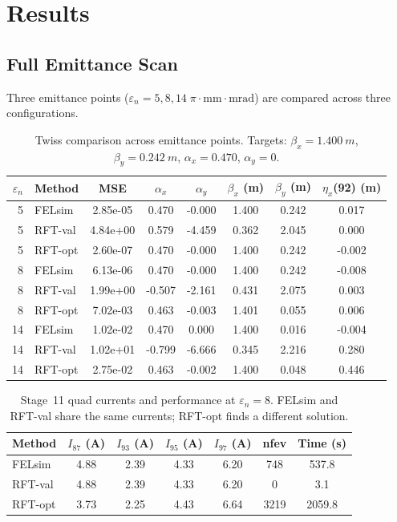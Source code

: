 \documentclass[11pt]{article}
\begin{document}
\section{Results}

\subsection{Full Emittance Scan}

Three emittance points ($\varepsilon_n = 5, 8, 14\;\pi\cdot\text{mm}\cdot\text{mrad}$)
are compared across three configurations.

\begin{table}[ht]
\centering
\small
\caption{Twiss comparison across emittance points.  Targets:
  $\beta_x = \SI{1.400}{m}$, $\beta_y = \SI{0.242}{m}$,
  $\alpha_x = 0.470$, $\alpha_y = 0$.}
\label{tab:twiss}
\begin{tabular}{@{} r l S[scientific-notation=true] S S S S S @{}}
\toprule
{$\varepsilon_n$} & {Method} & {MSE} & {$\alpha_x$} & {$\alpha_y$} & {$\beta_x$ (m)} & {$\beta_y$ (m)}
  & {$\eta_x$(92) (m)} \\
  & FELsim  & 2.85e-05 &  0.470 & -0.000 & 1.400 & 0.242 &  0.017 \\
5  & RFT-val & 4.84e+00 &  0.579 & -4.459 & 0.362 & 2.045 &  0.000 \\
5  & RFT-opt & 2.60e-07 &  0.470 & -0.000 & 1.400 & 0.242 & -0.002 \\
  & FELsim  & 6.13e-06 &  0.470 & -0.000 & 1.400 & 0.242 & -0.008 \\
8  & RFT-val & 1.99e+00 & -0.507 & -2.161 & 0.431 & 2.075 &  0.003 \\
8  & RFT-opt & 7.02e-03 &  0.463 & -0.003 & 1.401 & 0.055 &  0.006 \\
 & FELsim  & 1.02e-02 &  0.470 &  0.000 & 1.400 & 0.016 & -0.004 \\
14 & RFT-val & 1.02e+01 & -0.799 & -6.666 & 0.345 & 2.216 &  0.280 \\
14 & RFT-opt & 2.75e-02 &  0.463 & -0.002 & 1.400 & 0.048 &  0.446 \\
\bottomrule
\end{tabular}
\end{table}

\begin{table}[ht]
\centering
\small
\caption{Stage~11 quad currents and performance at $\varepsilon_n = 8$.
  FELsim and RFT-val share the same currents; RFT-opt finds a different
  solution.}
\label{tab:currents}
\begin{tabular}{@{} l SSSS SS @{}}
\toprule
{Method} & {$I_{87}$ (A)} & {$I_{93}$ (A)} & {$I_{95}$ (A)} & {$I_{97}$ (A)}
  & {nfev} & {Time (s)} \\
\midrule
FELsim  & 4.88 & 2.39 & 4.33 & 6.20 &  748 & 537.8 \\
RFT-val & 4.88 & 2.39 & 4.33 & 6.20 &    0 &   3.1 \\
RFT-opt & 3.73 & 2.25 & 4.43 & 6.64 & 3219 & 2059.8 \\
\bottomrule
\end{tabular}
\end{table}
\end{document}
